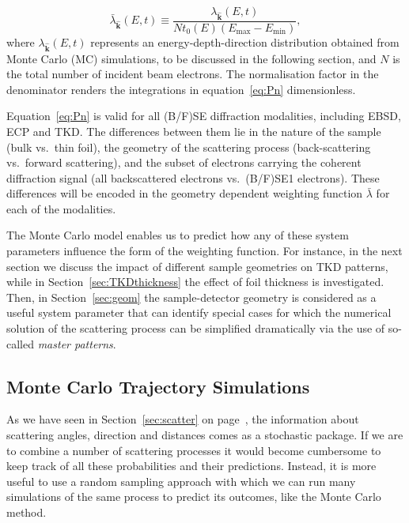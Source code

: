 \begin{equation}
    \bar{\lambda}_{\hat{\mathbf{k}}}(E,t) \equiv \frac{\lambda_{\hat{\mathbf{k}}}(E,t)}{N t_0(E)(E_{\text{max}}-E_{\text{min}})},
\end{equation}
where $\lambda_{\hat{\mathbf{k}}}(E,t)$ represents an energy-depth-direction distribution obtained from Monte Carlo (MC) simulations, to be discussed in the following section, and $N$ is the total number of incident beam electrons.  The normalisation factor in the denominator renders the integrations in equation~\ref{eq:Pn} dimensionless.

Equation~\ref{eq:Pn} is valid for all (B/F)SE diffraction modalities, including EBSD, ECP and TKD. The differences between them lie in the nature of the sample (bulk vs.\ thin foil), the geometry of the scattering process (back-scattering vs.\ forward scattering), and the subset of electrons carrying the coherent diffraction signal (all backscattered electrons vs.\ (B/F)SE1 electrons). These differences will be encoded in the geometry dependent weighting function $\bar{\lambda}$ for each of the modalities. 

The Monte Carlo model enables us to predict how any of these system parameters influence the form of the weighting function. For instance, in the next section we discuss the impact of different sample geometries on TKD patterns, while in Section~\ref{sec:TKDthickness} the effect of foil thickness is investigated. Then, in Section~\ref{sec:geom} the sample-detector geometry is considered as a useful system parameter that can identify special cases for which the numerical solution of the scattering process can be simplified dramatically via the use of so-called \textit{master patterns}. 


\subsection{Monte Carlo Trajectory Simulations }
\label{sec:MC}

As we have seen in Section~\ref{sec:scatter} on page~\pageref{sec:scatter}, the information about scattering angles, direction and distances comes as a stochastic package.  If we are to combine a number of scattering processes it would become cumbersome to keep track of all these probabilities and their predictions. Instead, it is more useful to use a random sampling approach with which we can run many simulations of the same process to predict its outcomes, like the Monte Carlo method.



